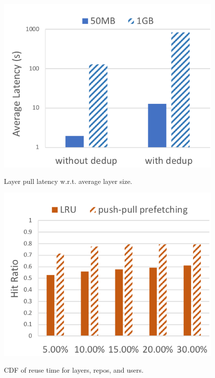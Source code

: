 \begin{figure}[t]
	\centering
	\begin{minipage}{0.225\textwidth}
		\centering
		\includegraphics[width=1\textwidth]{graphs/avglatency_dedup_nodedup.png}
		\caption{Layer pull latency w.r.t. average layer size.}
		\label{fig:avg_latency_dedup_nodedup}
	\end{minipage}
	\begin{minipage}{0.225\textwidth}
		\centering
		\includegraphics[width=1\textwidth]{graphs/lru_prefetch_hits.png}
		\caption{CDF of reuse time for layers, repos, and users.}
		\vspace{-3pt}
		\label{fig:lru_prefetching_hits}
	\end{minipage}
\end{figure}
